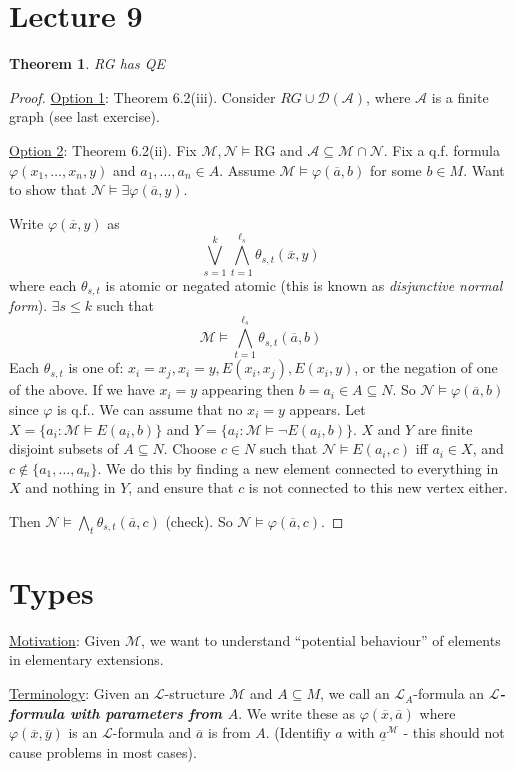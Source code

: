 \documentclass[]{article}
\theoremstyle{custhm}
\newtheorem{theorem}{Theorem}[section]
\theoremstyle{cusdef}
\theoremstyle{custhm}
\theoremstyle{custhm}
\theoremstyle{custhm}
\theoremstyle{ex}
\theoremstyle{custhm}
\theoremstyle{cusdef}
\theoremstyle{remark}
\theoremstyle{remark}
\newcommand{\undf}[1]{\textit{\textbf{#1}}}
\renewcommand{\L}{\mathcal{L}}
\newcommand{\M}{\mathcal{M}}
\renewcommand{\phi}{\varphi}
\renewcommand{\bar}{\overline}
\newcommand{\N}{\mathcal{N}}
\newcommand{\A}{\mathcal{A}}
\newcommand{\D}{\mathcal{D}}
\renewcommand{\subset}{\subseteq}
\begin{document}
\section{Lecture 9}

\begin{theorem}
RG has QE
\end{theorem}
\begin{proof}
\underline{Option 1}: Theorem 6.2(iii). Consider $RG \cup \D(\A)$, where $\A$ is a finite graph (see last exercise).

\underline{Option 2}: Theorem 6.2(ii). Fix $\M,\N\models \textrm{RG}$ and $\A\subset \M\cap \N$. Fix a q.f. formula $\phi(x_1,\dots,x_n,y)$ and $a_1,\dots,a_n\in A$. Assume $\M\models \phi(\bar{a},b)$ for some $b\in M$. Want to show that $\N\models \exists \phi(\bar{a},y)$.

Write $\phi(\bar{x},y)$ as $$\bigvee_{s=1}^{k}\bigwedge_{t=1}^{\ell_s}\theta_{s,t}(\bar{x},y)$$ where each $\theta_{s,t}$ is atomic or negated atomic (this is known as \textit{disjunctive normal form}). $\exists s\le k$ such that $$\M\models\bigwedge_{t=1}^{\ell_s}\theta_{s,t}(\bar{a},b)$$
Each $\theta_{s,t}$ is one of: $x_i = x_j, x_i = y,E(x_i,x_j),E(x_i,y)$, or the negation of one of the above. If we have $x_i = y$ appearing then $b = a_i\in A\subset N$. So $\N \models \phi(\bar{a},b)$ since $\phi$ is q.f.. We can assume that no $x_i = y$ appears. Let $X = \{a_i:\M\models E(a_i,b)\}$ and $Y = \{a_i : \M\models \neg E(a_i,b)\}$. $X$ and $Y$ are finite disjoint subsets of $A\subset N$. Choose $c\in N$ such that $\N\models E(a_i,c)$ iff $a_i \in X$, and $c\not\in\{a_1,\dots,a_n\}$. We do this by finding a new element connected to everything in $X$ and nothing in $Y$, and ensure that $c$ is not connected to this new vertex either.

Then $\N\models \bigwedge_{t}\theta_{s,t}(\bar{a},c)$ (check). So $\N\models \phi(\bar{a},c)$.
\end{proof}

\section*{Types}

\underline{Motivation}: Given $\M$, we want to understand ``potential behaviour'' of elements in elementary extensions.

\underline{Terminology}: Given an $\L$-structure $\M$ and $A\subset M$, we call an $\L_A$-formula an \undf{$\L$-formula with parameters from $A$}. We write these as $\phi(\bar{x},\bar{a})$ where $\phi(\bar{x},\bar{y})$ is an $\L$-formula and $\bar{a}$ is from $A$. (Identifiy $a$ with $\underline{a}^\M$ - this should not cause problems in most cases).
\end{document}
